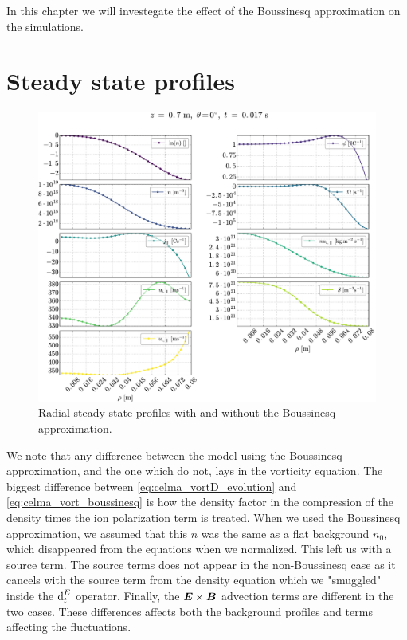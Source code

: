 In this chapter we will investegate the effect of the Boussinesq approximation on the simulations.

\section{Steady state profiles}
%
\begin{figure}[h]
    \centering
    \includegraphics[width=1.0\textwidth]{fig/results/compareBouss/1DProfRad001B}
    \caption{Radial steady state profiles with and without the Boussinesq approximation.}
    \label{fig:compareBoussProfRad}
\end{figure}
%
We note that any difference between the model using the Boussinesq approximation, and the one which do not, lays in the vorticity equation.
The biggest difference between \cref{eq:celma_vortD_evolution} and \cref{eq:celma_vort_boussinesq} is how the density factor in the compression of the density times the ion polarization term is treated.
When we used the Boussinesq approximation, we assumed that this $n$ was the same as a flat background $n_0$, which disappeared from the equations when we normalized.
This left us with a source term.
The source terms does not appear in the non-Boussinesq case as it cancels with the source term from the density equation which we "smuggled" inside the $\text{d}_t^E$ operator.
Finally, the $\boldsymbol{E}\times\boldsymbol{B}$ advection terms are different in the two cases.
These differences affects both the background profiles and terms affecting the fluctuations.

